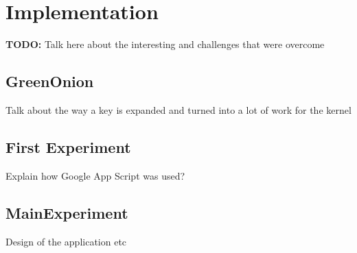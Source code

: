 \chapter{Implementation}
\label{cha:Implementation}

\textbf{TODO: } Talk here about the interesting and challenges that were overcome

\section{GreenOnion}
Talk about the way a key is expanded and turned into a lot
of work for the kernel

\section{First Experiment}
Explain how Google App Script was used?

\section{MainExperiment}
Design of the application etc